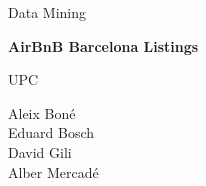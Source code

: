 \thispagestyle{empty}
\clearpage
\setcounter{page}{-1}

\begin{titlepage}
{
    \centering
    \null
    \vfill
    {\Large Data Mining\par}
    \vspace{2em}
    {\Huge \bfseries
        AirBnB Barcelona Listings
    \par}
    \vspace{2em}
    {\large \scshape
        UPC
    \par}
    \vfill
\begin{center}

\end{center}
    \vspace{3cm}

    \vfill
    {\raggedleft \large
Aleix Boné\\
Eduard Bosch\\
David Gili\\
Alber Mercadé\\
        \par}
}
\end{titlepage}

\pagebreak
